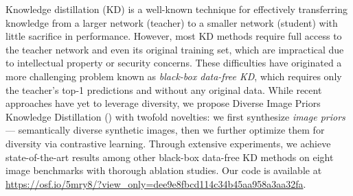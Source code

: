 Knowledge distillation (KD) is a well-known technique for effectively transferring knowledge from a larger network (teacher) to a smaller network (student) with little sacrifice in performance.
However, most KD methods require full access to the teacher network and even its original training set, which are impractical due to intellectual property or security concerns.
These difficulties have originated a more challenging problem known as \textit{black-box data-free KD}, which requires only the teacher's top-1 predictions and without any original data.
While recent approaches have yet to leverage diversity, we propose Diverse Image Priors Knowledge Distillation ({\methodname}) with twofold novelties: we first synthesize \textit{image priors} --- semantically diverse synthetic images, then we further optimize them for diversity via contrastive learning.
Through extensive experiments, we achieve state-of-the-art results among other black-box data-free KD methods on eight image benchmarks with thorough ablation studies.
Our code is available at \url{https://osf.io/5mry8/?view_only=dee9e8fbcd114c34b45aa958a3aa32fa}.

